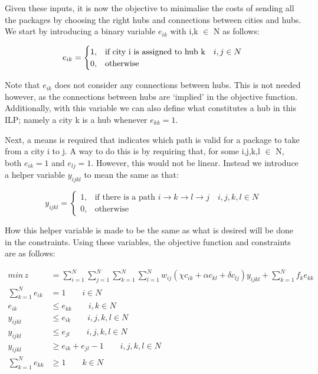 \documentclass{article}
\begin{document}
Given these inputs, it is now the objective to minimalise the costs of sending all the packages by choosing the right hubs and connections between cities and hubs. We start by introducing a binary variable $e_{ik}$ with i,k $\in$ N as follows:
    
$$
e_{ik} =
\begin{cases} 
1, & \text{if city i is assigned to hub k} \quad i,j \in N  \\ 
0, & \text{otherwise}
\end{cases} \\
$$

Note that $e_{ik}$ does not consider any connections between hubs. This is not needed however, as the connections between hubs are `implied' in the objective function. Additionally, with this variable we can also define what constitutes a hub in this ILP; namely a city k is a hub whenever $e_{kk} = 1$.

Next, a means is required that indicates which path is valid for a package to take from a city i to j. A way to do this is by requiring that, for some i,j,k,l $\in$ N, both $e_{ik} = 1$ and $e_{lj} = 1$. However, this would not be linear. Instead we introduce a helper variable $y_{ijkl}$ to mean the same as that:

$$
y_{ijkl} =
\begin{cases} 
1, & \text{if there is a path } i \rightarrow k \rightarrow l \rightarrow j \quad i,j,k,l \in N \\ 
0, & \text{otherwise} 
\end{cases}
$$
    
How this helper variable is made to be the same as what is desired will be done in the constraints.
Using these variables, the objective function and constraints are as follows:

    
\begin{align}
    min \, z &= \sum^N_{i=1}\sum^N_{j=1}\sum^N_{k=1}\sum^N_{l=1} w_{ij}(\chi c_{ik} + \alpha c_{kl} + \delta c_{lj})y_{ijkl} + \sum^N_{k=1} f_k e_{kk} \label{obj}\\
    \sum^N_{k=1}e_{ik} &= 1 \quad\quad i \in N \label{C1}\\
    e_{ik} & \leq e_{kk} \quad\quad i,k \in N \label{C2}\\
    y_{ijkl} &\leq e_{ik} \quad\quad i,j,k,l \in N \label{C3}\\
    y_{ijkl} &\leq e_{jl} \quad\quad i,j,k,l \in N \label{C4}\\
    y_{ijkl} &\geq e_{ik} + e_{jl} - 1 \quad\quad i,j,k,l \in N \label{C5}\\
    \sum^N_{k=1}e_{kk} &\geq 1 \quad\quad k \in N \label{C6}
\end{align}
\end{document}
